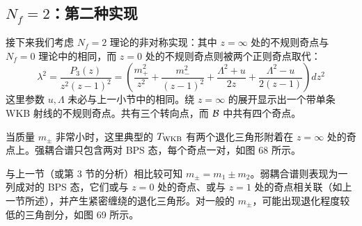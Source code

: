
\subsection{$N_f=2$：第二种实现} \label{subsec:Nf2second}

接下来我们考虑 $N_f=2$ 理论的非对称实现：其中 $z=\infty$ 处的不规则奇点与 $N_f=0$ 理论中的相同，而 $z=0$ 处的不规则奇点则被两个正则奇点取代：
\begin{equation}
\lambda^2 = \frac{P_3(z)}{z^2 (z-1)^2} = \left( \frac{m_+^2}{z^2}+\frac{m_-^2}{(z-1)^2} + \frac{\Lambda^2 +u}{2 z} + \frac{\Lambda^2 -u}{2 (z-1)} \right) dz^2
\end{equation}
这里参数 $u,\Lambda$ 未必与上一小节中的相同。绕 $z=\infty$ 的展开显示出一个带单条 WKB 射线的不规则奇点。共有三个转向点，而 $\mathcal{B}$ 中共有四个奇点。

当质量 $m_\pm$ 非常小时，这里典型的 $T_{\rm WKB}$ 有两个退化三角形附着在 $z=\infty$ 处的奇点上。强耦合谱只包含两对 BPS 态，每个奇点一对，如图 68 所示。

与上一节（或第 3 节的分析）相比较可知 $m_\pm = m_1 \pm m_2$。弱耦合谱则表现为一列成对的 BPS 态，它们或与 $z=0$ 处的奇点、或与 $z=1$ 处的奇点相关联（如上一节所述），并产生紧密缠绕的退化三角形。对一般的 $m_\pm$，可能出现退化程度较低的三角剖分，如图 69 所示。

